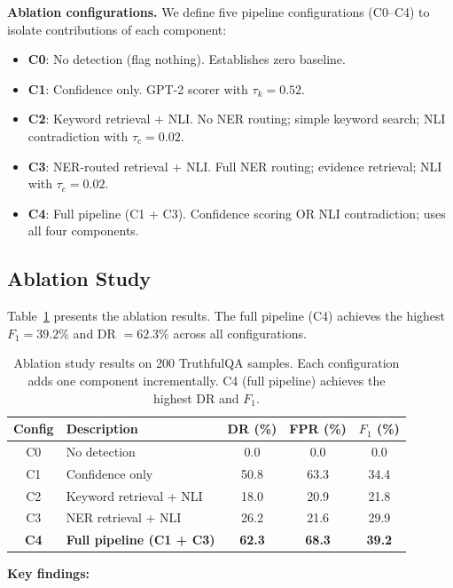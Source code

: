 \documentclass[11pt,a4paper]{article}
\newcommand{\fone}{F_1}
\newcommand{\tauK}{\tau_k}
\newcommand{\tauC}{\tau_c}
\begin{document}
\textbf{Ablation configurations.} We define five pipeline configurations
(C0--C4) to isolate contributions of each component:
\begin{itemize}
\item \textbf{C0}: No detection (flag nothing). Establishes zero baseline.
\item \textbf{C1}: Confidence only. GPT-2 scorer with $\tauK = 0.52$.
\item \textbf{C2}: Keyword retrieval + NLI. No NER routing; simple keyword
      search; NLI contradiction with $\tauC = 0.02$.
\item \textbf{C3}: NER-routed retrieval + NLI. Full NER routing; evidence
      retrieval; NLI with $\tauC = 0.02$.
\item \textbf{C4}: Full pipeline (C1 + C3). Confidence scoring OR NLI
      contradiction; uses all four components.
\end{itemize}

\subsection{Ablation Study}
\label{sec:ablation}

Table~\ref{tab:ablation} presents the ablation results. The full pipeline (C4)
achieves the highest $\fone = 39.2\%$ and DR $= 62.3\%$ across all
configurations.

\begin{table}[htb]
\centering
\caption{Ablation study results on 200 TruthfulQA samples. Each configuration
adds one component incrementally. C4 (full pipeline) achieves the highest DR
and $\fone$.}
\label{tab:ablation}
\begin{tabular}{clccc}
\toprule
\textbf{Config} & \textbf{Description} & \textbf{DR (\%)} & \textbf{FPR (\%)} & \textbf{$\fone$ (\%)} \\
\midrule
C0 & No detection              &  0.0 &  0.0 &  0.0 \\
C1 & Confidence only           & 50.8 & 63.3 & 34.4 \\
C2 & Keyword retrieval + NLI   & 18.0 & 20.9 & 21.8 \\
C3 & NER retrieval + NLI       & 26.2 & 21.6 & 29.9 \\
\textbf{C4} & \textbf{Full pipeline (C1 + C3)} & \textbf{62.3} & \textbf{68.3} & \textbf{39.2} \\
\bottomrule
\end{tabular}
\end{table}

\textbf{Key findings:}
\end{document}
